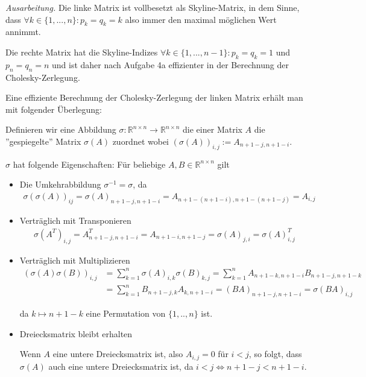 \documentclass[]{article}
\newenvironment{ausarbeitung}{\vspace{3mm}\noindent\textit{Ausarbeitung.}}{}
\begin{document}
\begin{ausarbeitung}
	Die linke Matrix ist vollbesetzt als Skyline-Matrix, in dem Sinne, dass $\forall k \in \{1, ..., n\}: p_k = q_k = k$ also immer den maximal möglichen Wert annimmt.
	
	Die rechte Matrix hat die Skyline-Indizes $\forall k \in \{1, ..., n - 1\}: p_k = q_k = 1$ und $p_n = q_n = n$ und ist daher nach Aufgabe 4a effizienter in der Berechnung der Cholesky-Zerlegung.
	
	Eine effiziente Berechnung der Cholesky-Zerlegung der linken Matrix erhält man mit folgender Überlegung:
	
	Definieren wir eine Abbildung $\sigma: \mathbb{R}^{n\times n} \rightarrow \mathbb{R}^{n \times n}$ die einer Matrix $A$ die ''gespiegelte'' Matrix $\sigma(A)$ zuordnet wobei $(\sigma(A))_{i,j} := A_{n+1-j, n+1-i}$.
	
	$\sigma$ hat folgende Eigenschaften: Für beliebige $A,B \in \mathbb{R}^{n \times n}$ gilt
	
	\begin{itemize}
		\item Die Umkehrabbildung $\sigma^{-1} = \sigma$, da
			\begin{align*}
				\sigma(\sigma(A))_{ij} = \sigma(A)_{n+1-j,n+1-i} = A_{n+1-(n+1-i),n+1-(n+1-j)} = A_{i,j}
			\end{align*}
		
		\item Verträglich mit Transponieren
			\begin{align*}
				\sigma(A^T)_{i,j} = A^T_{n+1-j,n+1-i} = A_{n+1-i,n+1-j} = \sigma(A)_{j,i} = \sigma(A)^T_{i,j}
			\end{align*}
		\item Verträglich mit Multiplizieren
			\begin{align*}
				(\sigma(A)\sigma(B))_{i,j} &= \sum_{k=1}^{n}\sigma(A)_{i,k}\sigma(B)_{k,j} = \sum_{k=1}^{n} A_{n+1-k,n+1-i}B_{n+1-j,n+1-k} \\
				&= \sum_{k=1}^{n} B_{n+1-j,k}A_{k,n+1-i} = (BA)_{n+1-j,n+1-i} = \sigma(BA)_{i,j}
			\end{align*}
		
			da $k \mapsto n+1-k$ eine Permutation von $\{1, .., n\}$ ist.
		\item Dreiecksmatrix bleibt erhalten
		
		Wenn $A$ eine untere Dreiecksmatrix ist, also $A_{i,j} = 0$ für $i < j$, so folgt, dass $\sigma(A)$ auch eine untere Dreiecksmatrix ist, da $i < j \iff n+1-j < n+1-i$.
		

\end{itemize}
\end{ausarbeitung}
\end{document}
